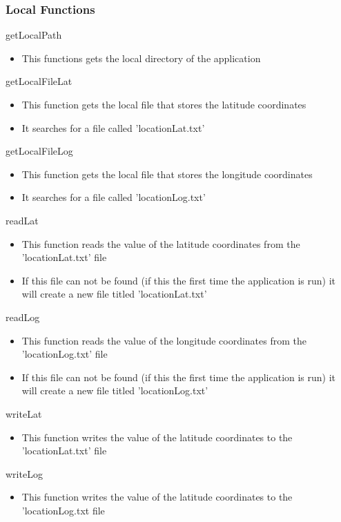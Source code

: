 \documentclass[12pt, titlepage]{article}
\begin{document}
\begin{itemize}
\subsubsection{Local Functions}

\noindent getLocalPath
\begin{itemize}
\item This functions gets the local directory of the application
\end{itemize}

\noindent getLocalFileLat
\begin{itemize}
\item This function gets the local file that stores the latitude coordinates
\item It searches for a file called 'locationLat.txt'
\end{itemize}

\noindent getLocalFileLog
\begin{itemize}
\item This function gets the local file that stores the longitude coordinates
\item It searches for a file called 'locationLog.txt'
\end{itemize}

\noindent readLat
\begin{itemize}
\item This function reads the value of the latitude coordinates from the 'locationLat.txt' file
\item If this file can not be found (if this the first time the application is run) it will create a new file titled 'locationLat.txt'
\end{itemize}

\noindent readLog
\begin{itemize}
\item This function reads the value of the longitude coordinates from the 'locationLog.txt' file
\item If this file can not be found (if this the first time the application is run) it will create a new file titled 'locationLog.txt'
\end{itemize}

\noindent writeLat
\begin{itemize}
\item This function writes the value of the latitude coordinates to the 'locationLat.txt' file
\end{itemize}

\noindent writeLog
\begin{itemize}
\item This function writes the value of the latitude coordinates to the 'locationLog.txt file
\end{itemize}


\end{itemize}
\end{document}
